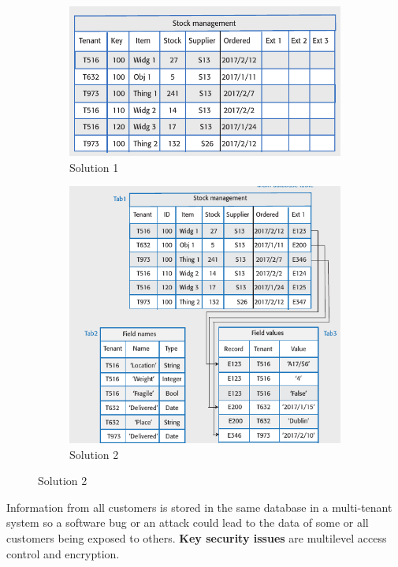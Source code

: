 \documentclass[10pt,a4paper]{report}
\begin{document}
\begin{figure}
	\centering
	\begin{subfigure}{.5\textwidth}
		\centering
		\includegraphics[width=.9\linewidth]{image55}
		\caption{Solution 1}
		\label{image55}
	\end{subfigure}%
	\begin{subfigure}{.5\textwidth}
		\centering
		\includegraphics[width=.9\linewidth]{image56}
		\caption{Solution 2}
		\label{image56}
	\end{subfigure}
	
	\label{image56a}
\end{figure}

Information from all customers is stored in the same database in a multi-tenant system so a software bug or an attack could lead to the data of some or all customers being exposed to others. \textbf{Key security issues} are multilevel access control and encryption. 
\end{document}
